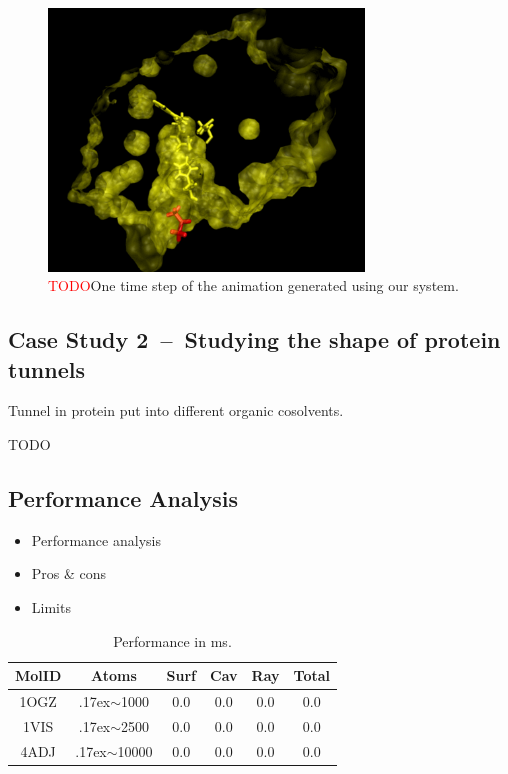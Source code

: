 \begin{figure}[htb]
  \centering
  \includegraphics[width=3.3in]{image/animation.png}
  \caption{\textcolor{red}{TODO}One time step of the animation generated using our system.}
	\label{fig:animation2}
\end{figure}


\subsection{Case Study 2~--~Studying the shape of protein tunnels}
Tunnel in protein put into different organic cosolvents.

TODO

\subsection{Performance Analysis}
\label{sec:performance}

\begin{itemize}
  \item Performance analysis
  \item Pros \& cons
  \item Limits
\end{itemize}

\def\tweakedsim{\raise.17ex\hbox{$\scriptstyle\sim$}}


\begin{table}[htb]
  \caption{Performance in ms.}
  \label{tab:performance}
  \scriptsize
  \begin{center}
    \begin{tabular}{cccccc}
      MolID & Atoms & Surf & Cav & Ray & Total \\
    \hline
      1OGZ &  {\tweakedsim}1000 & 0.0 & 0.0 & 0.0 & 0.0 \\
      1VIS &  {\tweakedsim}2500 & 0.0 & 0.0 & 0.0 & 0.0 \\
      4ADJ & {\tweakedsim}10000 & 0.0 & 0.0 & 0.0 & 0.0
    \end{tabular}
  \end{center}
\end{table}
